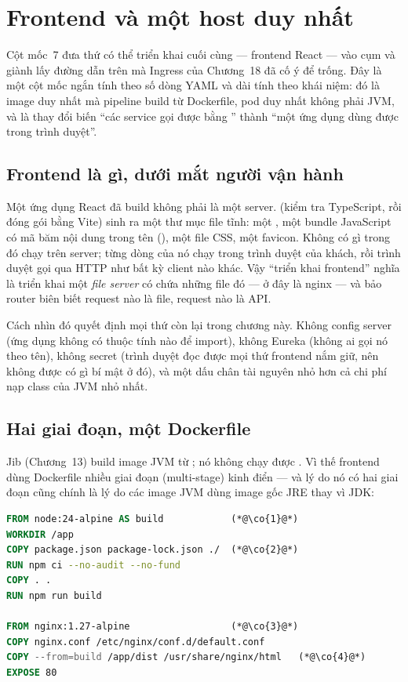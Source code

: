 \chapter{Frontend và một host duy nhất}
\label{ch:frontend}

Cột mốc~7 đưa thứ có thể triển khai cuối cùng --- frontend React ---
vào cụm và giành lấy đường dẫn \code{/} trên  mà
Ingress của Chương~18 đã cố ý để trống. Đây là một cột mốc ngắn tính
theo số dòng YAML và dài tính theo khái niệm: đó là image duy nhất mà
pipeline build từ Dockerfile, pod duy nhất không phải JVM, và là thay
đổi biến ``các service gọi được bằng '' thành ``một ứng
dụng dùng được trong trình duyệt''.

\section{Frontend là gì, dưới mắt người vận hành}

Một ứng dụng React đã build không phải là một server.  (kiểm tra TypeScript, rồi đóng gói bằng Vite) sinh ra một thư
mục file tĩnh: một , một bundle JavaScript có mã băm
nội dung trong tên (), một file CSS, một
favicon. Không có gì trong đó chạy trên server; từng dòng của nó chạy
trong trình duyệt của khách, rồi trình duyệt gọi  qua
HTTP như bất kỳ client nào khác. Vậy ``triển khai frontend'' nghĩa là
triển khai một \emph{file server} có chứa những file đó --- ở đây là
nginx --- và bảo router biên biết request nào là file, request nào là
API.

Cách nhìn đó quyết định mọi thứ còn lại trong chương này. Không config
server (ứng dụng không có thuộc tính nào để import), không Eureka
(không ai gọi nó theo tên), không secret (trình duyệt đọc được mọi
thứ frontend nắm giữ, nên không được có gì bí mật ở đó), và một dấu
chân tài nguyên nhỏ hơn cả chi phí nạp class của JVM nhỏ nhất.

\section{Hai giai đoạn, một Dockerfile}

Jib (Chương~13) build image JVM từ ; nó không
chạy được . Vì thế frontend dùng Dockerfile nhiều giai đoạn
(multi-stage) kinh điển --- và lý do nó có hai giai đoạn cũng chính là
lý do các image JVM dùng image gốc JRE thay vì JDK:

\begin{lstlisting}[language=dockerfile]
FROM node:24-alpine AS build            (*@\co{1}@*)
WORKDIR /app
COPY package.json package-lock.json ./  (*@\co{2}@*)
RUN npm ci --no-audit --no-fund
COPY . .
RUN npm run build

FROM nginx:1.27-alpine                  (*@\co{3}@*)
COPY nginx.conf /etc/nginx/conf.d/default.conf
COPY --from=build /app/dist /usr/share/nginx/html   (*@\co{4}@*)
EXPOSE 80
\end{lstlisting}


